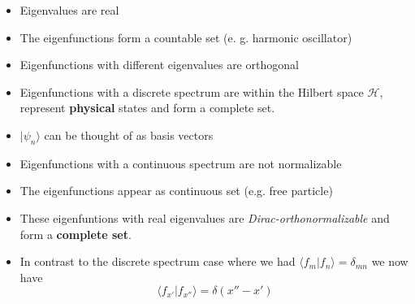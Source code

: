 \begin{itemize}
    \item Eigenvalues are real
    \item The eigenfunctions form a countable set (e. g. harmonic oscillator)
    \item Eigenfunctions with different eigenvalues are orthogonal
    \item Eigenfunctions with a discrete spectrum are within the Hilbert space $\mathcal{H}$, represent \textbf{physical} states and form a complete set.
    \item $|\psi_n\rangle$ can be thought of as basis vectors
\end{itemize}


\begin{itemize}
    \item Eigenfunctions with a continuous spectrum are not normalizable
    \item The eigenfunctions appear as continuous set (e.g. free particle)
    \item These eigenfuntions with real eigenvalues are \textit{Dirac-orthonormalizable} and form a \textbf{complete set}.
    \item In contrast to the discrete spectrum case where we had $\langle f_m|f_n\rangle=\delta_{mn}$ we now have
          \noindent\begin{equation*}
              \langle f_{x'}|f_{x''}\rangle=\delta(x''-x')
          \end{equation*}
\end{itemize}

